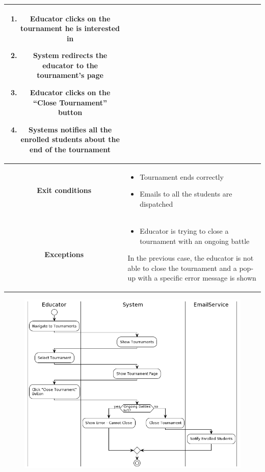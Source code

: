 \begin{center}
\begin{tabular}{ |c|m{10cm}| }
\begin{enumerate}
            \item Educator clicks on the tournament he is interested in
            \item System redirects the educator to the tournament’s page
            \item Educator clicks on the “Close Tournament” button 
            \item Systems notifies all the enrolled students about the end of the tournament
        \end{enumerate} \\
        \hline
        \textbf{Exit conditions} &
        \begin{itemize}
            \item Tournament ends correctly
            \item Emails to all the students are dispatched
        \end{itemize} \\
        \hline
        \textbf{Exceptions} & 
        \begin{itemize}
            \item Educator is trying to close a tournament with an ongoing battle
        \end{itemize} 
        In the previous case, the educator is not able to close the tournament and a pop-up with a specific error message is shown \\
        \hline
    \end{tabular}
    \begin{figure}[H]
        \hspace{7px}
        \includegraphics[scale=0.5]{Diagrams/activity_closetournament.png}

\end{figure}
\end{center}
